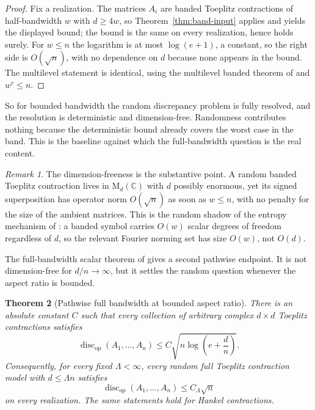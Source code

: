 \documentclass[11pt]{amsart}
\numberwithin{equation}{section}
\newtheorem{theorem}{Theorem}[section]
\theoremstyle{definition}
\theoremstyle{remark}
\newtheorem{remark}[theorem]{Remark}
\newcommand{\C}{\mathbb C}
\newcommand{\M}{\mathrm M}
\newcommand{\op}{\mathrm{op}}
\newcommand{\discop}{\operatorname{disc}_{\op}}
\begin{document}
\begin{proof}
Fix a realization. The matrices $A_i$ are banded Toeplitz contractions of
half-bandwidth $w$ with $d\ge4w$, so Theorem~\ref{thm:band-input} applies and
yields the displayed bound; the bound is the same on every realization, hence
holds surely. For $w\le n$ the logarithm is at most $\log(e+1)$, a constant, so
the right side is $O(\sqrt n)$, with no dependence on $d$ because none appears in
the bound. The multilevel statement is identical, using the multilevel banded
theorem of \cite{Shmalo-paper12} and $w^r\le n$.
\end{proof}

So for bounded bandwidth the random discrepancy problem is fully resolved, and
the resolution is deterministic and dimension-free. Randomness contributes
nothing because the deterministic bound already covers the worst case in the
band. This is the baseline against which the full-bandwidth question is the real
content.

\begin{remark}
The dimension-freeness is the substantive point. A random banded Toeplitz
contraction lives in $\M_d(\C)$ with $d$ possibly enormous, yet its signed
superposition has operator norm $O(\sqrt n)$ as soon as $w\le n$, with no penalty
for the size of the ambient matrices. This is the random shadow of the entropy
mechanism of \cite{Shmalo-paper12}: a banded symbol carries $O(w)$ scalar degrees
of freedom regardless of $d$, so the relevant Fourier norming set has size
$O(w)$, not $O(d)$.
\end{remark}

The full-bandwidth scalar theorem of \cite{Shmalo-paper12} gives a second
pathwise endpoint.  It is not dimension-free for \(d/n\to\infty\), but it
settles the random question whenever the aspect ratio is bounded.

\begin{theorem}[Pathwise full bandwidth at bounded aspect ratio]
\label{thm:bounded-aspect}
There is an absolute constant \(C\) such that every collection of arbitrary
complex \(d\times d\) Toeplitz contractions satisfies
\[
\discop(A_1,\ldots,A_n)
\le C\sqrt{n\log\left(e+\frac dn\right)} .
\]
Consequently, for every fixed \(\Lambda<\infty\), every random full Toeplitz
contraction model with \(d\le \Lambda n\) satisfies
\[
\discop(A_1,\ldots,A_n)\le C_\Lambda\sqrt n
\]
on every realization.  The same statements hold for Hankel contractions.
\end{theorem}
\end{document}
